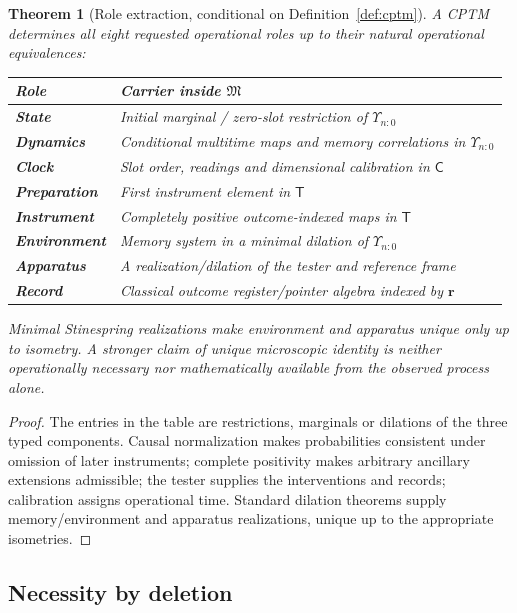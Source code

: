\documentclass[11pt,a4paper]{article}
\newtheorem{theorem}{Theorem}[section]
\theoremstyle{definition}
\theoremstyle{remark}
\begin{document}
\begin{theorem}[Role extraction, conditional on Definition~\ref{def:cptm}]
A CPTM determines all eight requested operational roles up to their natural operational equivalences:
\begin{center}
\begin{tabularx}{0.96\textwidth}{@{}>{\bfseries}lX@{}}
\toprule
Role & Carrier inside $\mathfrak M$\\
\midrule
State & Initial marginal / zero-slot restriction of $\Upsilon_{n:0}$\\
Dynamics & Conditional multitime maps and memory correlations in $\Upsilon_{n:0}$\\
Clock & Slot order, readings and dimensional calibration in $\mathsf C$\\
Preparation & First instrument element in $\mathsf T$\\
Instrument & Completely positive outcome-indexed maps in $\mathsf T$\\
Environment & Memory system in a minimal dilation of $\Upsilon_{n:0}$\\
Apparatus & A realization/dilation of the tester and reference frame\\
Record & Classical outcome register/pointer algebra indexed by $\mathbf r$\\
\bottomrule
\end{tabularx}
\end{center}
Minimal Stinespring realizations make environment and apparatus unique only up to isometry. A stronger claim of unique microscopic identity is neither operationally necessary nor mathematically available from the observed process alone.
\end{theorem}

\begin{proof}
The entries in the table are restrictions, marginals or dilations of the three typed components. Causal normalization makes probabilities consistent under omission of later instruments; complete positivity makes arbitrary ancillary extensions admissible; the tester supplies the interventions and records; calibration assigns operational time. Standard dilation theorems supply memory/environment and apparatus realizations, unique up to the appropriate isometries.
\end{proof}

\subsection{Necessity by deletion}
\end{document}
